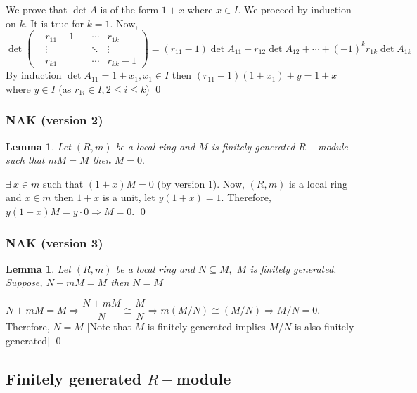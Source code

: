 \documentclass[11pt]{amsart}
\newtheorem{lemma}[theorem]{Lemma}%
\begin{document}
 We prove that $\det A$ is of the form $1+x$ where $x\in I.$ We proceed by induction on $k.$ It is true for $k=1.$ Now, $$\det \begin{pmatrix}
&r_{11}-1 \quad &\cdots  &r_{1k}\\

&\vdots \quad  &\ddots &\vdots\\
&r_{k1} \quad &\cdots  &r_{kk}-1
\end{pmatrix}=(r_{11}-1)\det A_{11}-r_{12}\det A_{12}+\cdots +(-1)^kr_{1k}\det A_{1k}$$
By induction $\det A_{11}=1+x_1,x_1\in I$ then $(r_{11}-1)(1+x_1)+y=1+x$ where $y\in I$ (as $r_{1i}\in I, 2\leq i\leq k$) \qed
\subsubsection{NAK (version 2)}
\begin{lemma}
Let $(R,m)$ be a local ring and $M$ is finitely generated $R-$module such that $mM=M$ then $M=0.$
\end{lemma}
\proof $\exists~ x\in m$ such that $(1+x)M=0$ (by version 1). Now, $(R,m)$ is a local ring and $x\in m$ then $1+x$ is a unit, let $y(1+x)=1.$ Therefore, $y(1+x)M=y\cdot 0\Rightarrow M=0.$ \qed
\subsubsection{NAK (version 3)}
\begin{lemma}
Let $(R,m)$ be a local ring and $N\subseteq M,$ $M$ is finitely generated. Suppose, $N+mM=M$ then $N=M$
\end{lemma}
\proof $N+mM=M \Rightarrow \dfrac{N+mM}{N}\cong \dfrac{M}{N} \Rightarrow m(M/N)\cong (M/N) \Rightarrow M/N=0.$
Therefore, $N=M$ [Note that $M$ is finitely generated implies $M/N$ is also finitely generated] \qed

\subsection{Finitely generated $R-$module}
\end{document}
